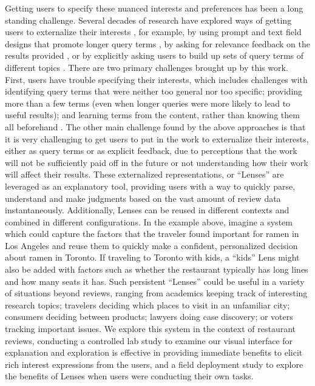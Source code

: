 \documentclass{sigchi}
\begin{document}
Getting users to specify these nuanced interests and preferences has been a long standing challenge. Several decades of research have explored ways of getting users to externalize their interests \cite{jansen2000real,belkin2001rutgers}, for example, by using prompt and text field designs that promote longer query terms \cite{franzen2000verbosity,belkin2003query},  by asking for relevance feedback on the results provided \cite{salton1990improving,rui1998relevance,peltonen2017negative}, or by explicitly asking users to build up sets of query terms of different topics \cite{hearst1996visualizing,hoeber2006comparative}. There are two primary challenges brought up by this work. First, users have trouble specifying their interests, which includes challenges with identifying query terms that were neither too general nor too specific; providing more than a few terms (even when longer queries were more likely to lead to useful results); and learning terms from the content, rather than knowing them all beforehand  \cite{belkin2003query,salton1990improving}. The other main challenge found by the above approaches is that it is very challenging to get users to put in the work to externalize their interests, either as query terms or as explicit feedback, due to perceptions that the work will not be sufficiently paid off in the future or not understanding how their work will affect their results. 
These externalized representations, or ``Lenses'' are leveraged as an explanatory tool, providing users with a way to quickly parse, understand and make judgments based on the vast amount of review data instantaneously. Additionally, Lenses can be reused in different contexts and combined in different configurations. In the example above, imagine a system which could capture the factors that the traveler found important for ramen in Los Angeles and reuse them to quickly make a confident, personalized decision about ramen in Toronto. If traveling to Toronto with kids, a ``kids'' Lens might also be added with factors such as whether the restaurant typically has long lines and how many seats it has. Such persistent ``Lenses'' could be useful in a variety of situations beyond reviews, ranging from academics keeping track of interesting research topics; travelers deciding which places to visit in an unfamiliar city; consumers deciding between products; lawyers doing case discovery; or voters tracking important issues.
We explore this system in the context of restaurant reviews, conducting a controlled lab study to examine our visual interface for explanation and exploration is effective in providing immediate benefits to elicit rich interest expressions from the users, and a field deployment study to explore the benefits of Lenses when users were conducting their own tasks. 
\end{document}
